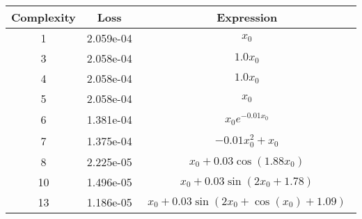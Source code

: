 \begin{center}
        \begin{tabular}{|c|c|c|}
        \hline
        Complexity & Loss & Expression \\
        \hline
        1 & 2.059e-04 & $\begin{aligned}x_{0}\end{aligned}$\\ \hline3 & 2.058e-04 & $\begin{aligned}1.0 x_{0}\end{aligned}$\\ \hline4 & 2.058e-04 & $\begin{aligned}1.0 x_{0}\end{aligned}$\\ \hline5 & 2.058e-04 & $\begin{aligned}x_{0}\end{aligned}$\\ \hline6 & 1.381e-04 & $\begin{aligned}x_{0} e^{- 0.01 x_{0}}\end{aligned}$\\ \hline7 & 1.375e-04 & $\begin{aligned}- 0.01 x_{0}^{2} + x_{0}\end{aligned}$\\ \hline8 & 2.225e-05 & $\begin{aligned}x_{0} + 0.03 \cos{\left(1.88 x_{0} \right)}\end{aligned}$\\ \hline10 & 1.496e-05 & $\begin{aligned}x_{0} + 0.03 \sin{\left(2 x_{0} + 1.78 \right)}\end{aligned}$\\ \hline13 & 1.186e-05 & $\begin{aligned}x_{0} + 0.03 \sin{\left(2 x_{0} + \cos{\left(x_{0} \right)} + 1.09 \right)}\end{aligned}$\\ \hline\end{tabular}
        \end{center}
        